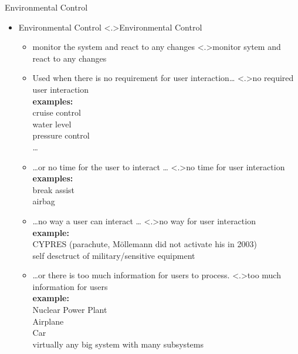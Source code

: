 \documentclass[ngerman={babel}, utf8, bigger, t, xcolor={table,dvipsnames}, ompress, hyperref={bookmarks,colorlinks},red]{beamer}
\begin{document}
\begin{frame}{Environmental Control}
	\begin{itemize}
		\item Environmental Control
		\note<.>{Environmental Control}
		\begin{itemize}
			\item monitor the system and react to any changes
			\note<.>{monitor sytem and react to any changes}
			\item Used when there is no requirement for user interaction\dots{}
			\note<.>{no required user interaction \\ \textbf{examples:}\\ cruise control \\ water level \\ pressure control \\ \dots }
			\item \dots or no time for the user to interact \dots
			\note<.>{no time for user interaction \\ \textbf{examples:}\\ break assist \\ airbag}
			\item \dots no way a user can interact \dots{}
			\note<.>{no way for user interaction \\ \textbf{example:}\\ CYPRES {\tiny (parachute, Möllemann did not activate his in 2003)} \\ self desctruct of military/sensitive equipment}
			\item \dots or there is too much information for users to process.
			\note<.>{too much information for users \\ \textbf{example:}\\ Nuclear Power Plant \\ Airplane \\ Car \\ virtually any big system with many subsystems}
		\end{itemize}
	\end{itemize}
\end{frame}
\end{document}
